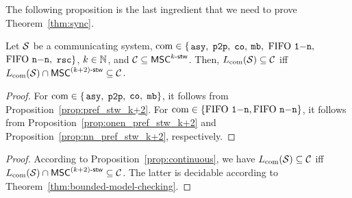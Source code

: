 The following proposition is the last ingredient that we need to prove Theorem~\ref{thm:sync}.

\begin{proposition}\label{prop:continuous}
	Let $\mathcal{S}$ be a communicating system, $\textup{com} \in \{$$\mathtt{asy}, $ $\mathtt{p2p}, $ $\mathtt{co}, $ $\mathtt{mb}, $ $\text{FIFO } \mathtt{1\mathsf{-}n}, $ $\text{FIFO } \mathtt{n\mathsf{-}n}, $ $\mathtt{rsc}\}$,
	$k \in \mathbb{N}$, and $\mathcal{C} \subseteq \mathsf{MSC}^{k\textup{-}\mathsf{stw}}$.
	Then, $L_{\textup{com}}(\mathcal{S}) \subseteq \mathcal{C}$ iff
	$L_{\textup{com}}(\mathcal{S}) \cap \mathsf{MSC}^{(k+2)\textup{-}\mathsf{stw}} \subseteq \mathcal{C}$.
\end{proposition}
\begin{proof}
For $\textup{com} \in \{$$\mathtt{asy}, $ $\mathtt{p2p}, $ $\mathtt{co}, $ $\mathtt{mb}\}$, it follows from Proposition~\ref{prop:pref_stw_k+2}. For $\textup{com} \in \{\text{FIFO } \mathtt{1\mathsf{-}n}, \text{FIFO } \mathtt{n\mathsf{-}n}\}$, it follows from Proposition~\ref{prop:onen_pref_stw_k+2} and Proposition~\ref{prop:nn_pref_stw_k+2}, respectively.
\end{proof}

\thmsync*
\begin{proof}
    According to Proposition~\ref{prop:continuous}, we have $L_{\textup{com}}(\mathcal{S}) \subseteq \mathcal{C}$ iff
	$L_{\textup{com}}(\mathcal{S}) \cap \mathsf{MSC}^{(k+2)\textup{-}\mathsf{stw}} \subseteq \mathcal{C}$. The latter is decidable according to Theorem~\ref{thm:bounded-model-checking}.
\end{proof}

